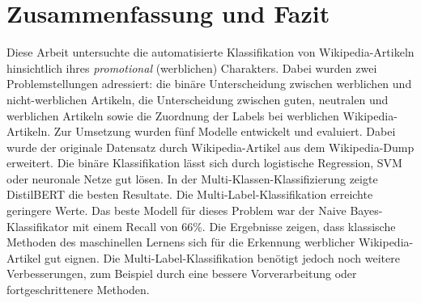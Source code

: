 \section{Zusammenfassung und Fazit}
\label{ZusammenfassungUndFazit}
Diese Arbeit untersuchte die automatisierte Klassifikation von Wikipedia-Artikeln hinsichtlich ihres \textit{promotional} (werblichen) Charakters. Dabei wurden zwei Problemstellungen adressiert: die binäre Unterscheidung zwischen werblichen und nicht-werblichen Artikeln, die Unterscheidung zwischen guten, neutralen und werblichen Artikeln sowie die Zuordnung der Labels bei werblichen Wikipedia-Artikeln. Zur Umsetzung wurden fünf Modelle entwickelt und evaluiert. Dabei wurde der originale Datensatz durch Wikipedia-Artikel aus dem Wikipedia-Dump erweitert. Die binäre Klassifikation lässt sich durch logistische Regression, SVM oder neuronale Netze gut lösen. In der Multi-Klassen-Klassifizierung zeigte DistilBERT die besten Resultate. Die Multi-Label-Klassifikation erreichte geringere Werte. Das beste Modell für dieses Problem war der Naive Bayes-Klassifikator mit einem Recall von 66\%. Die Ergebnisse zeigen, dass klassische Methoden des maschinellen Lernens sich für die Erkennung werblicher Wikipedia-Artikel gut eignen. Die Multi-Label-Klassifikation benötigt jedoch noch weitere Verbesserungen, zum Beispiel durch eine bessere Vorverarbeitung oder fortgeschrittenere Methoden.
